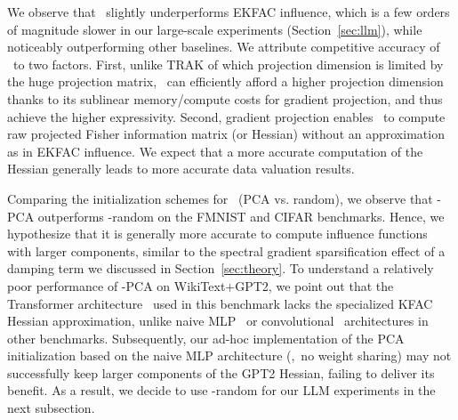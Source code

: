 We observe that \method\ slightly underperforms EKFAC influence, which is a few orders of magnitude slower in our large-scale experiments (Section~\ref{sec:llm}), while noticeably outperforming other baselines. We attribute competitive accuracy of \method\ to two factors. First, unlike TRAK of which projection dimension is limited by the huge projection matrix, \method\ can efficiently afford a higher projection dimension thanks to its sublinear memory/compute costs for gradient projection, and thus achieve the higher expressivity.
Second, gradient projection enables \method\ to compute raw projected Fisher information matrix (or Hessian) without an approximation as in EKFAC influence. We expect that a more accurate computation of the Hessian generally leads to more accurate data valuation results.

Comparing the initialization schemes for \method\ (PCA vs. random), we observe that \method-PCA outperforms \method-random on the FMNIST and CIFAR benchmarks. Hence, we hypothesize that it is generally more accurate to compute influence functions with larger components, similar to the spectral gradient sparsification effect of a damping term we discussed in Section~\ref{sec:theory}. To understand a relatively poor performance of \method-PCA on WikiText+GPT2, we point out that the Transformer architecture~\cite{vaswani2017attention} used in this benchmark lacks the specialized KFAC Hessian approximation, unlike naive MLP~\cite{martens2015optimizing} or convolutional~\cite{grosse2016kronecker} architectures in other benchmarks. Subsequently, our ad-hoc implementation of the PCA initialization based on the naive MLP architecture (\ie,\ no weight sharing) may not successfully keep larger components of the GPT2 Hessian, failing to deliver its benefit. As a result, we decide to use \method-random for our LLM experiments in the next subsection.

